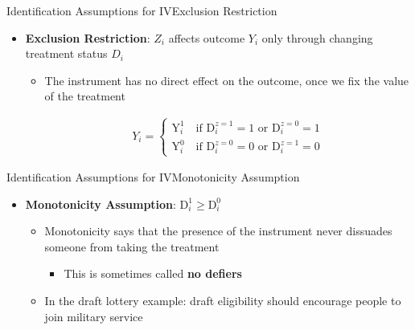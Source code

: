 \documentclass[dvipsnames,hyperref={pdfpagelabels=false}]{beamer}
\begin{document}
\begin{frame}{Identification Assumptions for IV}{Exclusion Restriction}
	\begin{itemize}
		
		
		\item \textbf{Exclusion Restriction}: $Z_{i}$ affects outcome $Y_{i}$ only through changing treatment status $D_{i}$
		\vspace{0.2cm}
		\begin{itemize}	
			\item The instrument has no direct effect on the outcome, once we fix the value of the treatment	
		
			\begin{align*}
			Y_{i}=\left\lbrace
			\begin{array}{l}
				\mathrm{Y}^{1}_{i}\quad \text{if $\mathrm{D}^{z=1}_{i}=1$ or $\mathrm{D}^{z=0}_{i}=1$} \\
				\mathrm{Y}^{0}_{i}\quad \text{if $\mathrm{D}^{z=0}_{i}=0$ or $\mathrm{D}^{z=1}_{i}=0$}
			\end{array}\right.
		\end{align*}
		
		
			\end{itemize}
		
	\end{itemize}
\end{frame}




\begin{frame}{Identification Assumptions for IV}{Monotonicity Assumption}
	\begin{itemize}
		
		
	
		
		\item \textbf{Monotonicity Assumption}: $\mathrm{D}^{1}_{i} \geq \mathrm{D}^{0}_{i}$
		\vspace{0.2cm}
		\vspace{0.2cm}
			\begin{itemize}
		\item Monotonicity says that the presence of the instrument never dissuades someone from taking the treatment
		\vspace{0.2cm}
		\begin{itemize}
			\item This is sometimes called \textbf{no defiers}
		\end{itemize}
		\vspace{0.2cm}
		\item In the draft lottery example: draft eligibility 
		should encourage people to join military service 
			\end{itemize}
		
	\end{itemize}
\end{frame}
\end{document}
